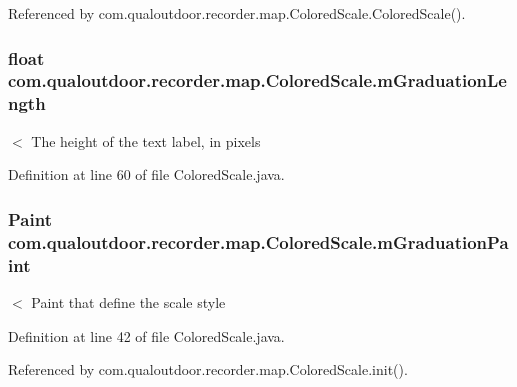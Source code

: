 Referenced by com.\-qualoutdoor.\-recorder.\-map.\-Colored\-Scale.\-Colored\-Scale().

\hypertarget{classcom_1_1qualoutdoor_1_1recorder_1_1map_1_1ColoredScale_a58b6c932c202e2187af22aeb947f1e23}{
\subsubsection[{m\-Graduation\-Length}]{\setlength{\rightskip}{0pt plus 5cm}float com.\-qualoutdoor.\-recorder.\-map.\-Colored\-Scale.\-m\-Graduation\-Length\hspace{0.3cm}{\ttfamily [private]}}}\label{classcom_1_1qualoutdoor_1_1recorder_1_1map_1_1ColoredScale_a58b6c932c202e2187af22aeb947f1e23}
$<$ The height of the text label, in pixels 

Definition at line 60 of file Colored\-Scale.\-java.

\hypertarget{classcom_1_1qualoutdoor_1_1recorder_1_1map_1_1ColoredScale_af3daf806f487c61997e7b16f3f49aa3c}{
\subsubsection[{m\-Graduation\-Paint}]{\setlength{\rightskip}{0pt plus 5cm}Paint com.\-qualoutdoor.\-recorder.\-map.\-Colored\-Scale.\-m\-Graduation\-Paint\hspace{0.3cm}{\ttfamily [private]}}}\label{classcom_1_1qualoutdoor_1_1recorder_1_1map_1_1ColoredScale_af3daf806f487c61997e7b16f3f49aa3c}
$<$ Paint that define the scale style 

Definition at line 42 of file Colored\-Scale.\-java.



Referenced by com.\-qualoutdoor.\-recorder.\-map.\-Colored\-Scale.\-init().

